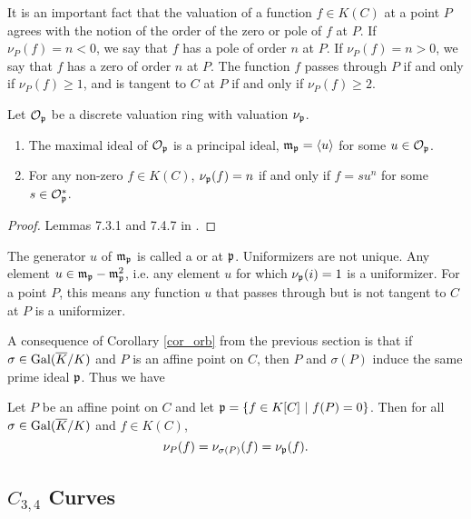 It is an important fact that the valuation of a function $f \in K(C)$ at a point $P$
agrees with the notion of the order of the zero or pole of $f$ at $P$.
If $\nu_P(f) = n < 0$, we say that $f$ has a pole of order $n$ at $P$.
If $\nu_P(f) = n > 0$, we say that $f$ has a zero of order $n$ at $P$.
The function $f$ passes through $P$ if and only if $\nu_P(f) \geq 1$,
and is tangent to $C$ at $P$ if and only if $\nu_P(f) \geq 2$.
\begin{proposition}
  Let $\cal O_{\frak p}$ be a discrete valuation ring with valuation $\nu_{\frak p}$.
  \begin{enumerate}[label=(\roman*)]
    \item
      The maximal ideal of $\cal O_{\frak p}$ is a principal ideal,
      $\frak m_{\frak p} = \pid u$ for some $u \in \cal O_{\frak p}$.
    \item
      For any non-zero $f \in K(C)$,
      $\nu_{\frak p}(f) = n$ if and only if $f = su^n$ for some $s \in \cal O_{\frak p}^*$.
  \end{enumerate}
\end{proposition}
\begin{proof}
  Lemmas 7.3.1 and 7.4.7 in \cite{galbraith12}.
\end{proof}
The generator $u$ of $\frak m_{\frak p}$ is called a  or  at $\frak p$.
Uniformizers are not unique.
Any element $u \in \frak m_{\frak p} - \frak m_{\frak p}^2$,
i.e. any element $u$ for which $\nu_{\frak p}(i) = 1$ is a uniformizer.
For a point $P$, this means any function $u$ that passes through but is not tangent to $C$ at $P$ is a uniformizer.

A consequence of Corollary \ref{cor_orb} from the previous section
is that if $\sigma \in \Gal(\bar K/K)$ and $P$ is an affine point on $C$,
then $P$ and $\sigma(P)$ induce the same prime ideal $\frak p$. Thus we have
\begin{proposition}
  \label{prop_valuation_on_orbit}
  Let $P$ be an affine point on $C$ and let $\frak p = \{ f \in K[C] ~|~ f(P) = 0 \}$.
  Then for all $\sigma \in \Gal(\bar K/K)$ and $f \in K(C)$,
  \[ \nu_P(f) = \nu_{\sigma(P)}(f) = \nu_{\frak p}(f). \]
\end{proposition}




\subsection{$C_{3,4}$ Curves}
\label{sec_c34_curves}


